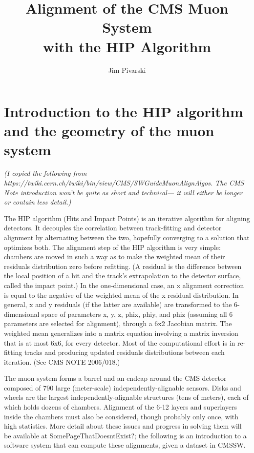 \documentclass[12pt]{article}
\title{Alignment of the CMS Muon System \\ with the HIP Algorithm}
\author{Jim Pivarski}
\begin{document}
\maketitle

\section{Introduction to the HIP algorithm and the geometry of the muon system}

{\it (I copied the following from
https://twiki.cern.ch/twiki/bin/view/CMS/SWGuideMuonAlignAlgos.  The
CMS Note introduction won't be quite as short and technical--- it will
either be longer or contain less detail.)}

The HIP algorithm (Hits and Impact Points) is an iterative algorithm
for aligning detectors. It decouples the correlation between
track-fitting and detector alignment by alternating between the two,
hopefully converging to a solution that optimizes both. The alignment
step of the HIP algorithm is very simple: chambers are moved in such a
way as to make the weighted mean of their residuals distribution zero
before refitting. (A residual is the difference between the local
position of a hit and the track's extrapolation to the detector
surface, called the impact point.) In the one-dimensional case, an x
alignment correction is equal to the negative of the weighted mean of
the x residual distribution. In general, x and y residuals (if the
latter are available) are transformed to the 6-dimensional space of
parameters x, y, z, phix, phiy, and phiz (assuming all 6 parameters
are selected for alignment), through a 6x2 Jacobian matrix. The
weighted mean generalizes into a matrix equation involving a matrix
inversion that is at most 6x6, for every detector. Most of the
computational effort is in re-fitting tracks and producing updated
residuals distributions between each iteration. (See CMS NOTE
2006/018.)

The muon system forms a barrel and an endcap around the CMS detector
composed of 790 large (meter-scale) independently-alignable
sensors. Disks and wheels are the largest independently-alignable
structures (tens of meters), each of which holds dozens of
chambers. Alignment of the 6-12 layers and superlayers inside the
chambers must also be considered, though probably only once, with high
statistics. More detail about these issues and progress in solving
them will be available at SomePageThatDoesntExist?; the following is
an introduction to a software system that can compute these
alignments, given a dataset in CMSSW.
\end{document}
